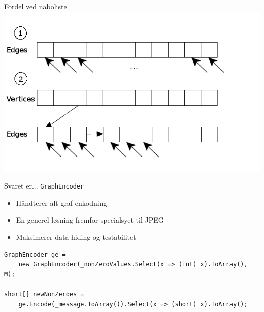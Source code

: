 \begin{frame}{Fordel ved naboliste}{}
\includegraphics[width=\textwidth]{figures/graphLists.png}
\end{frame}
\begin{frame}[fragile]{Svaret er...}{}
\lstinline|GraphEncoder|
\begin{itemize}
	\item Håndterer alt graf-enkodning
	\item En generel løsning fremfor specialsyet til JPEG
	\item Maksimerer data-hiding og testabilitet
\end{itemize}

\begin{lstlisting}[breaklines=true,basicstyle=\tiny,frame=single]
GraphEncoder ge = 
    new GraphEncoder(_nonZeroValues.Select(x => (int) x).ToArray(), M);

short[] newNonZeroes = 
    ge.Encode(_message.ToArray()).Select(x => (short) x).ToArray();
\end{lstlisting}
\end{frame}